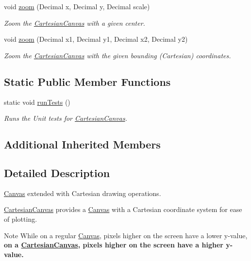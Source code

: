 \begin{DoxyCompactItemize}
void \hyperlink{classtsgl_1_1_cartesian_canvas_a69a378f61868c4c880889c33ec33c992}{zoom} (Decimal x, Decimal y, Decimal scale)
\begin{DoxyCompactList}\small\item\em Zoom the \hyperlink{classtsgl_1_1_cartesian_canvas}{Cartesian\+Canvas} with a given center. \end{DoxyCompactList}\item 
void \hyperlink{classtsgl_1_1_cartesian_canvas_adb1e999087c0ec7e4405d8ebd3ca9760}{zoom} (Decimal x1, Decimal y1, Decimal x2, Decimal y2)
\begin{DoxyCompactList}\small\item\em Zoom the \hyperlink{classtsgl_1_1_cartesian_canvas}{Cartesian\+Canvas} with the given bounding (Cartesian) coordinates. \end{DoxyCompactList}\end{DoxyCompactItemize}
\subsection*{Static Public Member Functions}
\begin{DoxyCompactItemize}
\item 
\hypertarget{classtsgl_1_1_cartesian_canvas_ae40d704629167ff70303a3c55ee3bb43}{}static void \hyperlink{classtsgl_1_1_cartesian_canvas_ae40d704629167ff70303a3c55ee3bb43}{run\+Tests} ()\label{classtsgl_1_1_cartesian_canvas_ae40d704629167ff70303a3c55ee3bb43}

\begin{DoxyCompactList}\small\item\em Runs the Unit tests for \hyperlink{classtsgl_1_1_cartesian_canvas}{Cartesian\+Canvas}. \end{DoxyCompactList}\end{DoxyCompactItemize}
\subsection*{Additional Inherited Members}


\subsection{Detailed Description}
\hyperlink{classtsgl_1_1_canvas}{Canvas} extended with Cartesian drawing operations. 

\hyperlink{classtsgl_1_1_cartesian_canvas}{Cartesian\+Canvas} provides a \hyperlink{classtsgl_1_1_canvas}{Canvas} with a Cartesian coordinate system for ease of plotting. \begin{DoxyNote}{Note}
While on a regular \hyperlink{classtsgl_1_1_canvas}{Canvas}, pixels higher on the screen have a lower y-\/value, {\bfseries on a \hyperlink{classtsgl_1_1_cartesian_canvas}{Cartesian\+Canvas}, pixels higher on the screen have a higher y-\/value.} 
\end{DoxyNote}



